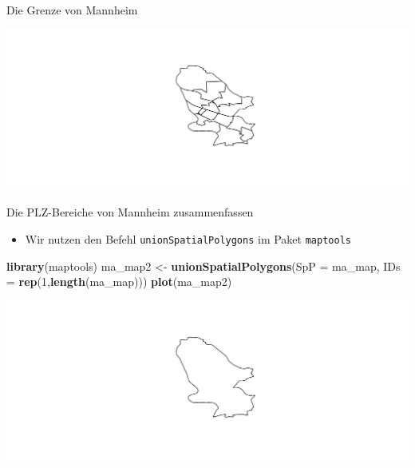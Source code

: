 \documentclass[ignorenonframetext,]{beamer}
\newenvironment{Shaded}{\begin{snugshade}}{\end{snugshade}}
\newcommand{\DataTypeTok}[1]{\textcolor[rgb]{0.13,0.29,0.53}{#1}}
\newcommand{\DecValTok}[1]{\textcolor[rgb]{0.00,0.00,0.81}{#1}}
\newcommand{\KeywordTok}[1]{\textcolor[rgb]{0.13,0.29,0.53}{\textbf{#1}}}
\newcommand{\NormalTok}[1]{#1}
\newcommand{\OperatorTok}[1]{\textcolor[rgb]{0.81,0.36,0.00}{\textbf{#1}}}
\newcommand{\StringTok}[1]{\textcolor[rgb]{0.31,0.60,0.02}{#1}}
\providecommand{\tightlist}{%
  \setlength{\itemsep}{0pt}\setlength{\parskip}{0pt}}
\begin{document}
\begin{frame}[fragile]{Die Grenze von Mannheim}
\protect\hypertarget{die-grenze-von-mannheim}{}

\begin{Shaded}
\end{Shaded}

\includegraphics{A6_Shapefiles_files/figure-beamer/unnamed-chunk-17-1.pdf}

\end{frame}

\begin{frame}[fragile]{Die PLZ-Bereiche von Mannheim zusammenfassen}
\protect\hypertarget{die-plz-bereiche-von-mannheim-zusammenfassen}{}

\begin{itemize}
\tightlist
\item
  Wir nutzen den Befehl \texttt{unionSpatialPolygons} im Paket
  \texttt{maptools}
\end{itemize}

\begin{Shaded}
\begin{Highlighting}[]
\KeywordTok{library}\NormalTok{(maptools)}
\NormalTok{ma_map2 <-}\StringTok{ }\KeywordTok{unionSpatialPolygons}\NormalTok{(}\DataTypeTok{SpP =}\NormalTok{ ma_map,}
                                \DataTypeTok{IDs =} \KeywordTok{rep}\NormalTok{(}\DecValTok{1}\NormalTok{,}\KeywordTok{length}\NormalTok{(ma_map)))}
\KeywordTok{plot}\NormalTok{(ma_map2)}
\end{Highlighting}
\end{Shaded}

\includegraphics{A6_Shapefiles_files/figure-beamer/unnamed-chunk-18-1.pdf}

\end{frame}
\end{document}
